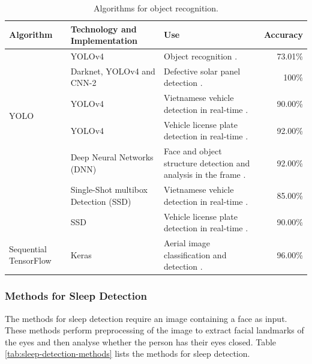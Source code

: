 \documentclass[a4paper,fleqn]{cas-sc}
\begin{document}
					\begin{table}[ht!]
						\caption{Algorithms for object recognition.}
						\label{tab:object-recognition}
						\centering
						\begin{tabular}{p{}p{}p{}p{}}
							\hline
							\multicolumn{1}{l}{\textbf{Algorithm}} & \multicolumn{1}{l}{\textbf{Technology and Implementation}} & \multicolumn{1}{l}{\textbf{Use}} & \multicolumn{1}{l}{\textbf{Accuracy}} \\ \hline
							\multirow{5}{*}{YOLO} & YOLOv4 & Object recognition \citep{Liu2021Objetcs}. & \multicolumn{1}{r}{73.01\%} \\
							& Darknet, YOLOv4 and CNN-2 & Defective solar panel detection \citep{Zou2022Drone}. & \multicolumn{1}{r}{100\%}\\
							& YOLOv4 & Vietnamese vehicle detection in real-time \citep{Minh2021Performance}. & \multicolumn{1}{r}{90.00\%} \\
							& YOLOv4 & Vehicle license plate detection in real-time \citep{Minh2021Performance}. & \multicolumn{1}{r}{92.00\%} \\
							& Deep Neural Networks (DNN) & Face and object structure detection and analysis in the frame \citep{Teja2021Real}. & \multicolumn{1}{r}{92.00\%} \\
							\rule{0pt}{12pt}\multirow{2}{*}{MobileNetV2} & Single-Shot multibox Detection (SSD) & Vietnamese vehicle detection in real-time \citep{Minh2021Performance}. & \multicolumn{1}{r}{85.00\%} \\
							& SSD & Vehicle license plate detection in real-time \citep{Minh2021Performance}. & \multicolumn{1}{r}{90.00\%} \\
							Sequential TensorFlow & Keras & Aerial image classification and detection \citep{Sudharshan2018Object}. & \multicolumn{1}{r}{96.00\%} \\ \hline
						\end{tabular}
					\end{table}
					
				\subsubsection*{Methods for Sleep Detection}
					The methods for sleep detection require an image containing a face as input. These methods perform preprocessing of the image to extract facial landmarks of the eyes and then analyse whether the person has their eyes closed. Table \ref{tab:sleep-detection-methods} lists the methods for sleep detection.
					
\end{document}
